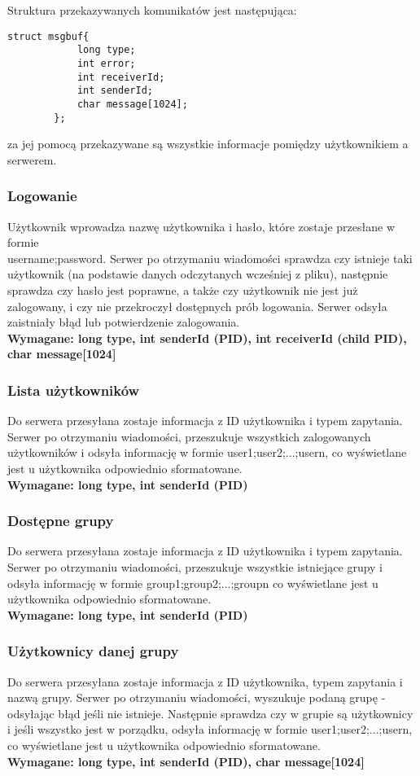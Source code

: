\documentclass[11pt]{article}
\begin{document}
	\noindent Struktura przekazywanych komunikatów jest następująca:
		\begin{lstlisting}[style = CStyle]
		struct msgbuf{
			long type;
			int error;
			int receiverId;
			int senderId;
			char message[1024];
		};\end{lstlisting}
	za jej pomocą przekazywane są wszystkie informacje pomiędzy użytkownikiem a serwerem.
	
	\subsubsection{Logowanie}
	Użytkownik wprowadza nazwę użytkownika i hasło, które zostaje przesłane w formie\\ username;password. Serwer po otrzymaniu wiadomości sprawdza czy istnieje taki użytkownik (na podstawie danych odczytanych wcześniej z pliku), następnie sprawdza czy hasło jest poprawne, a także czy użytkownik nie jest już zalogowany, i czy nie przekroczył dostępnych prób logowania. Serwer odsyła zaistniały błąd lub potwierdzenie zalogowania.\\
	\textbf{Wymagane: long type, int senderId (PID), int receiverId (child PID), char message[1024]}
	\subsubsection{Lista użytkowników}
	Do serwera przesyłana zostaje informacja z ID użytkownika i typem zapytania. Serwer po otrzymaniu wiadomości, przeszukuje wszystkich zalogowanych użytkowników i odsyła informację w formie user1;user2;...;usern, co wyświetlane jest u użytkownika odpowiednio sformatowane.\\
	\textbf{Wymagane: long type, int senderId (PID)}
	\subsubsection{Dostępne grupy}
	Do serwera przesyłana zostaje informacja z ID użytkownika i typem zapytania. Serwer po otrzymaniu wiadomości, przeszukuje wszystkie istniejące grupy i odsyła informację w formie group1;group2;...;groupn co wyświetlane jest u użytkownika odpowiednio sformatowane.\\
	\textbf{Wymagane: long type, int senderId (PID)}
	\subsubsection{Użytkownicy danej grupy}
	Do serwera przesyłana zostaje informacja z ID użytkownika, typem zapytania i nazwą grupy. Serwer po otrzymaniu wiadomości, wyszukuje podaną grupę - odsyłając błąd jeśli nie istnieje. Następnie sprawdza czy w grupie są użytkownicy i jeśli wszystko jest w porządku, odsyła informację w formie user1;user2;...;usern, co wyświetlane jest u użytkownika odpowiednio sformatowane.\\
	\textbf{Wymagane: long type, int senderId (PID), char message[1024]}
\end{document}
